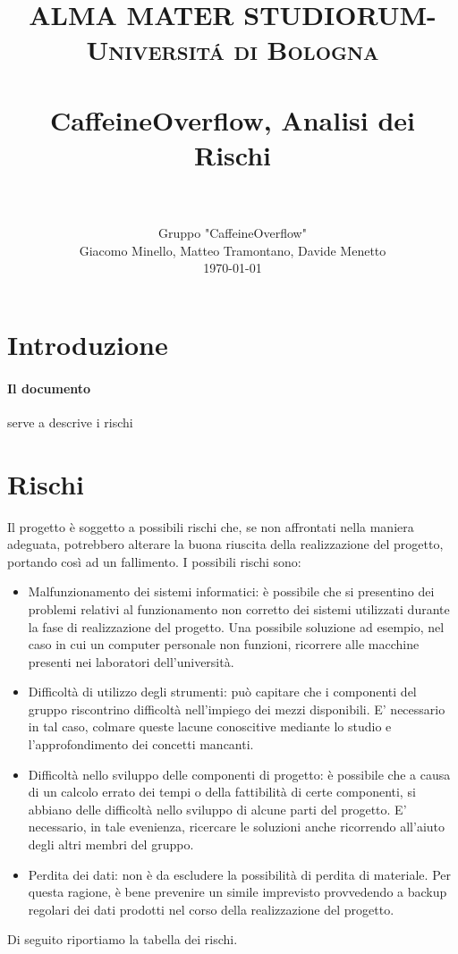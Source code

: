 \documentclass[paper=a4, fontsize=11pt]{scrartcl}
\title{
		\usefont{OT1}{bch}{b}{n}
		\normalfont \normalsize \textsc{ALMA MATER STUDIORUM- Universit\'a di Bologna} \\ [25pt]
		\horrule{0.5pt} \\[0.4cm]
		\huge CaffeineOverflow, Analisi dei Rischi \\
		\horrule{2pt} \\[0.5cm]
}
\author{ Gruppo "CaffeineOverflow"\\
		\normalfont 								\normalsize
        Giacomo Minello, Matteo Tramontano, Davide Menetto\\[-3pt]		\normalsize
        \today
}
\date{}
\numberwithin{equation}{section}		%
\numberwithin{figure}{section}			%
\numberwithin{table}{section}				%
\begin{document}
\maketitle
\section{Introduzione}
\paragraph{Il documento} serve a descrive i rischi
\section{Rischi}
Il progetto è soggetto a possibili rischi che, se non affrontati nella maniera adeguata, potrebbero alterare la
buona riuscita della realizzazione del progetto, portando così ad un fallimento.
I possibili rischi sono:
\begin{itemize}
\item Malfunzionamento dei sistemi informatici: è possibile che si presentino dei problemi relativi al
funzionamento non corretto dei sistemi utilizzati durante la fase di realizzazione del progetto. Una
possibile soluzione ad esempio, nel caso in cui un computer personale non funzioni, ricorrere alle
macchine presenti nei laboratori dell’università.
\item Difficoltà di utilizzo degli strumenti: può capitare che i componenti del gruppo riscontrino
difficoltà nell’impiego dei mezzi disponibili. E’ necessario in tal caso, colmare queste lacune
conoscitive mediante lo studio e l’approfondimento dei concetti mancanti.
\item Difficoltà nello sviluppo delle componenti di progetto: è possibile che a causa di un calcolo
errato dei tempi o della fattibilità di certe componenti, si abbiano delle difficoltà nello sviluppo di
alcune parti del progetto. E’ necessario, in tale evenienza, ricercare le soluzioni anche ricorrendo
all’aiuto degli altri membri del gruppo.
\item Perdita dei dati: non è da escludere la possibilità di perdita di materiale. Per questa ragione, è bene
prevenire un simile imprevisto provvedendo a backup regolari dei dati prodotti nel corso della
realizzazione del progetto.
\end{itemize}
Di seguito riportiamo la tabella dei rischi.
\end{document}
